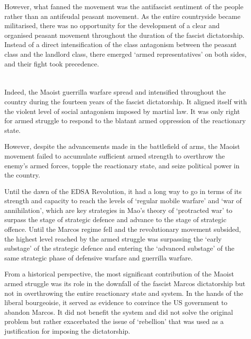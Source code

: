 However, 
what fanned the movement was the antifascist sentiment of the people 
rather than an antifeudal peasant movement. 
As the entire countryside became militarised, 
there was no opportunity 
for the development of a clear and organised peasant movement 
throughout the duration of the fascist dictatorship. 
Instead of a direct intensification of the class antagonism 
between the peasant class and the landlord class, 
there emerged `armed representatives' on both sides, 
and their fight took precedence.


\section{}
Indeed, 
the Maoist guerrilla warfare spread and intensified 
throughout the country 
during the fourteen years of the fascist dictatorship. 
It aligned itself 
with the violent level of social antagonism 
imposed by martial law. 
It was only right for armed struggle 
to respond to the blatant armed oppression 
of the reactionary state.

However,
despite the advancements made in the battlefield of arms, 
the Maoist movement failed to accumulate sufficient armed strength 
to overthrow the enemy's armed forces, 
topple the reactionary state, 
and seize political power in the country.

Until the dawn of the EDSA Revolution, 
it had a long way to go 
in terms of its strength and capacity 
to reach the levels of `regular mobile warfare' and `war of annihilation', 
which are key strategies in Mao's theory of `protracted war'
to surpass the stage of strategic defence 
and advance to the stage of strategic offence. 
Until the Marcos regime fell and the revolutionary movement subsided, 
the highest level reached by the armed struggle 
was surpassing the `early substage' of the strategic defence 
and entering the `advanced substage' 
of the same strategic phase of defensive warfare and guerrilla warfare.

From a historical perspective, 
the most significant contribution 
of the Maoist armed struggle 
was its role in the downfall of the fascist Marcos dictatorship 
but not in overthrowing the entire reactionary state and system. 
In the hands of the liberal bourgeoisie, 
it served as evidence to convince the US government to abandon Marcos. 
It did not benefit the system 
and did not solve the original problem 
but rather exacerbated the issue of `rebellion' 
that was used as a justification for imposing the dictatorship.

